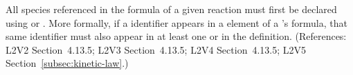 All species referenced in the \KineticLaw formula of a given reaction must
first be declared using \SpeciesReference or \ModifierSpeciesReference.
More formally, if a \Species identifier appears in a  element of
a \Reaction's \KineticLaw formula, that same identifier must also appear in
at least one \SpeciesReference or \ModifierSpeciesReference in the
\Reaction definition.  (References: L2V2 Section~4.13.5; L2V3
Section~4.13.5; L2V4 Section~4.13.5; L2V5 Section~\ref{subsec:kinetic-law}.)
